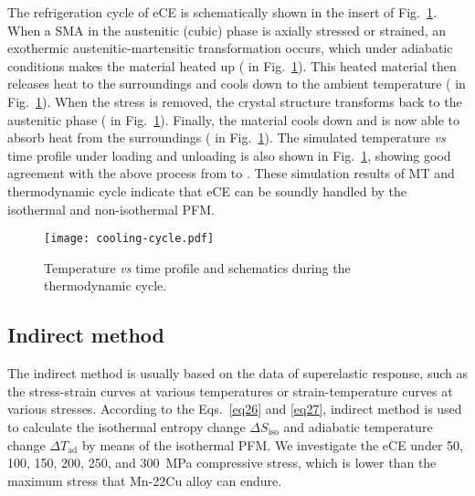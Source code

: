 \documentclass[reprint,3p,sort&compress,times,onecolumn]{elsarticle}
\begin{document}



The refrigeration cycle of eCE is schematically shown in the insert of Fig.~\ref{f3}.
When a SMA in the austenitic (cubic) phase is axially stressed or strained, an exothermic austenitic-martensitic transformation occurs, which under adiabatic conditions makes the material heated up ( in Fig.~\ref{f3}). This heated material then releases heat to the surroundings and cools down to the ambient temperature ( in Fig.~\ref{f3}). When the stress is removed, the crystal structure transforms back to the austenitic phase ( in Fig.~\ref{f3}). Finally, the material cools down and is now able to absorb heat from the surroundings ( in Fig.~\ref{f3}). 
The simulated temperature \textit{vs} time profile under loading and unloading is also shown in Fig.~\ref{f3}, showing good agreement with the above process from  to . These simulation results of MT and thermodynamic cycle indicate that eCE can be soundly handled by the isothermal and non-isothermal PFM.

\begin{figure}[!t]
\centering
  \texttt{[image: cooling-cycle.pdf]}
  \caption{Temperature \textit{vs} time profile and schematics during the thermodynamic cycle.} \label{f3}
\end{figure}



\subsection{Indirect method}
The indirect method is usually based on the data of superelastic response, such as the stress-strain curves at various temperatures or strain-temperature curves at various stresses. According to the Eqs.~\ref{eq26} and \ref{eq27}, indirect method is used to calculate the isothermal entropy change $\Delta S_{\text{iso}}$ and adiabatic temperature change $\Delta T_{\text{ad}}$ by means of the isothermal PFM. We investigate the eCE under 50, 100, 150, 200, 250, and 300~MPa compressive stress, which is lower than the maximum stress that Mn-22Cu alloy can endure.
\end{document}
